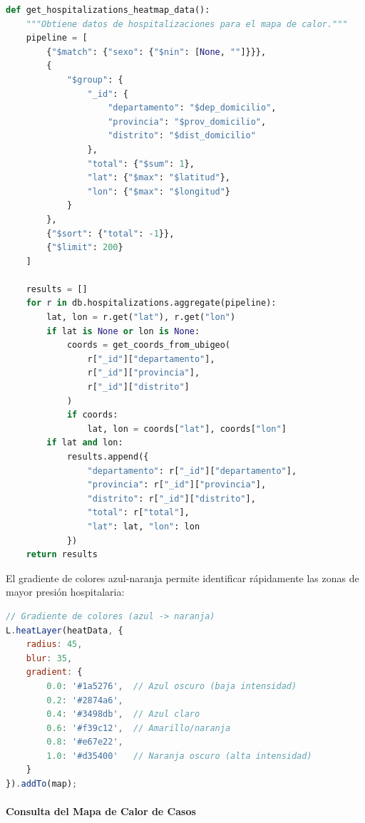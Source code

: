 \documentclass[12pt,a4paper]{article}
\begin{document}
\begin{lstlisting}[language=Python, caption={Consulta MongoDB para mapa de calor de hospitalizaciones}, label={lst:hosp-heatmap-query}]
def get_hospitalizations_heatmap_data():
    """Obtiene datos de hospitalizaciones para el mapa de calor."""
    pipeline = [
        {"$match": {"sexo": {"$nin": [None, ""]}}},
        {
            "$group": {
                "_id": {
                    "departamento": "$dep_domicilio",
                    "provincia": "$prov_domicilio",
                    "distrito": "$dist_domicilio"
                },
                "total": {"$sum": 1},
                "lat": {"$max": "$latitud"},
                "lon": {"$max": "$longitud"}
            }
        },
        {"$sort": {"total": -1}},
        {"$limit": 200}
    ]

    results = []
    for r in db.hospitalizations.aggregate(pipeline):
        lat, lon = r.get("lat"), r.get("lon")
        if lat is None or lon is None:
            coords = get_coords_from_ubigeo(
                r["_id"]["departamento"],
                r["_id"]["provincia"],
                r["_id"]["distrito"]
            )
            if coords:
                lat, lon = coords["lat"], coords["lon"]
        if lat and lon:
            results.append({
                "departamento": r["_id"]["departamento"],
                "provincia": r["_id"]["provincia"],
                "distrito": r["_id"]["distrito"],
                "total": r["total"],
                "lat": lat, "lon": lon
            })
    return results
\end{lstlisting}

El gradiente de colores azul-naranja permite identificar rápidamente las zonas de mayor presión hospitalaria:

\begin{lstlisting}[language=JavaScript, caption={Configuración visual del mapa de hospitalizaciones}, label={lst:hosp-heatmap-gradient}]
// Gradiente de colores (azul -> naranja)
L.heatLayer(heatData, {
    radius: 45,
    blur: 35,
    gradient: {
        0.0: '#1a5276',  // Azul oscuro (baja intensidad)
        0.2: '#2874a6',
        0.4: '#3498db',  // Azul claro
        0.6: '#f39c12',  // Amarillo/naranja
        0.8: '#e67e22',
        1.0: '#d35400'   // Naranja oscuro (alta intensidad)
    }
}).addTo(map);
\end{lstlisting}

\paragraph{Consulta del Mapa de Calor de Casos}
\end{document}
